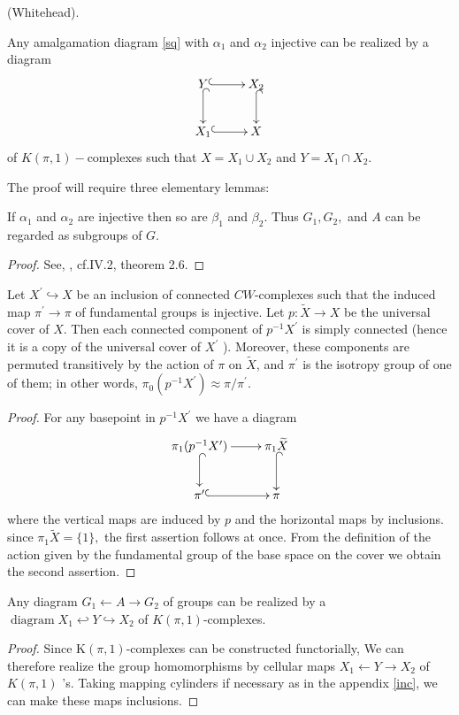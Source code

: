\begin{theorem}\label{thm2}{(Whitehead)}. 

Any amalgamation diagram \eqref{sq} with $\alpha_{1}$ and $\alpha_{2}$ injective can be realized by a diagram
$$
\xymatrix{
Y \ar@{^{(}->}[d] \ar@{^{(}->}[r] &X_2\ar@{^{(}->}[d]\\
 X_1\ar@{^{(}->}[r] & X}
$$
of $K(\pi, 1)-$complexes such that $X=X_{1} \cup X_{2}$ and $Y=X_{1} \cap X_{2}$.
\end{theorem}

The proof will require three elementary lemmas:
\begin{Lemma}
\label{lemma1}
If $\alpha_{1}$ and $\alpha_{2}$ are injective then so are $\beta_{1}$ and $\beta_{2} .$ Thus $G_{1}, G_{2},$ and $A$ can be regarded as subgroups of $G$.
\end{Lemma}
\begin{proof}
See, \cite{lyndon2015combinatorial}, cf.IV.2, theorem 2.6.
\end{proof}
\begin{lemma}
\label{lemma2}
Let $X^{\prime}\hookrightarrow X$ be an inclusion of connected $C W$-complexes such that the induced map $\pi^{\prime} \rightarrow \pi$ of fundamental groups is injective. Let $p: \widetilde{X} \rightarrow X$ be the universal cover of $X .$ Then each connected component of $p^{-1} X^{\prime}$ is simply connected (hence it is a copy of the universal cover of $X^{\prime}$ ). Moreover, these components are permuted transitively by the action of $\pi$ on $\widetilde{X}$, and $\pi^{\prime}$ is the isotropy group of one of them; in other words, $\pi_{0}\left(p^{-1} X^{\prime}\right) \approx \pi / \pi^{\prime}$.
\end{lemma}
\begin{proof}
For any basepoint in $p^{-1} X^{\prime}$ we have a diagram
$$
\xymatrix{
\pi_1 (p^{-1}X^{\prime}) \ar@{^{(}->}[d] \ar[r] &\pi_1 \widetilde{X}\ar@{^{(}->}[d]\\
\pi^{\prime} \ar@{^{(}->}[r] & \pi}
$$
where the vertical maps are induced by $p$ and the horizontal maps by inclusions. since $\pi_{1} \tilde{X}=\{1\},$ the first assertion follows at once. From the definition of the action given by the fundamental group of the base space on the cover we obtain the second assertion.
\end{proof}

\begin{lemma}
\label{lemma3}
Any diagram $G_{1} \leftarrow A \rightarrow G_{2}$ of groups can be realized by a $\operatorname{diagram} X_{1} \hookleftarrow  Y \hookrightarrow X_{2}$ of $K(\pi, 1)$-complexes.
\end{lemma}
\begin{proof}
Since $\mathrm{K}(\pi, 1)$-complexes can be constructed functorially, We can therefore realize the group homomorphisms by cellular maps $X_{1} \leftarrow Y \rightarrow X_{2}$ of $K(\pi, 1)$ 's. Taking mapping cylinders if necessary as in the appendix \ref{inc}, we can make these maps inclusions.
\end{proof}

